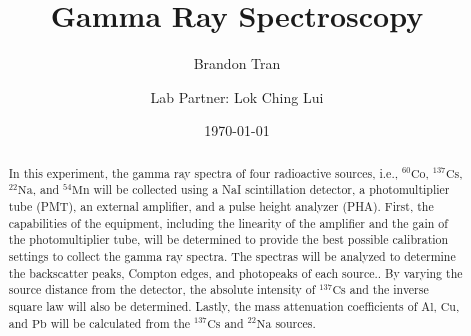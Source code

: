 \documentclass[%
 aip,
rsi,%
 amsmath,amssymb,
 reprint,%
author-numerical,%
]{revtex4-1}
\begin{document}

\title[Physics 111B- Gamma Ray Spectroscopy (GMA) Lab]{Gamma Ray Spectroscopy}


\author{Brandon Tran}
\author{Lab Partner: Lok Ching Lui}%
%


\date{\today}

\begin{abstract}

In this experiment, the gamma ray spectra of four radioactive sources, i.e., $\mathrm { ^ { 60 }Co}  $, $\mathrm {  ^ { 137 }Cs }$, $\mathrm { ^ { 22 }Na }$, and $\mathrm { ^ { 54 }Mn } $ will be collected using a NaI scintillation detector, a photomultiplier tube (PMT), an external amplifier, and a pulse height analyzer (PHA). First, the capabilities of the equipment, including the linearity of the amplifier and the gain of the photomultiplier tube, will be determined to provide the best possible calibration settings to collect the gamma ray spectra. The spectras will be analyzed to determine the backscatter peaks, Compton edges, and photopeaks of each source.. By varying the source distance from the detector, the absolute intensity of $\mathrm {  ^ { 137 }Cs }$ and the inverse square law will also be determined.  Lastly, the mass attenuation coefficients of $\mathrm { Al}$, $\mathrm {Cu}$, and $\mathrm {Pb}$ will be calculated from the $\mathrm { ^ { 137 }Cs } $ and $\mathrm { ^ { 22 }Na }$ sources.

\end{abstract} 


\maketitle
\end{document}
